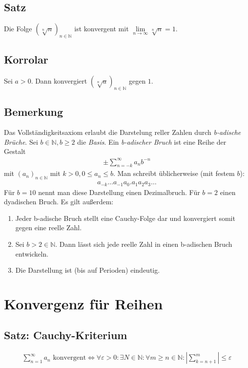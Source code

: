 \documentclass{scrreprt}
\newcommand{\NN}{\mathbb{N}}
\begin{document}
   	\section{Satz}
   	Die Folge $(\sqrt[n]{n})_{n \in \NN}$ ist konvergent mit $\lim\limits_{n \to \infty} \sqrt[n]{n} = 1$.

   	\section{Korrolar}
   	Sei $a>0$. Dann konvergiert $(\sqrt[n]{a})_{n \in \NN}$ gegen $1$.

   	\section{Bemerkung}
   	Das Vollständigkeitsaxiom erlaubt die Darstelung reller Zahlen durch \emph{b-adische Brüche}. Sei $b \in \NN, b \geq 2$ die \emph{Basis}. Ein \emph{b-adischer Bruch} ist eine Reihe der Gestalt
   	\begin{align*}
   		\pm\sum\limits_{n = -k}^\infty a_n b^{-n}
   	\end{align*}
   	mit $(a_n)_{n \in \NN}$ mit $k>0, 0 \leq a_n \leq b$. Man schreibt üblicherweise (mit festem $b$):
   	\begin{align*}
   		a_{-k}\dots a_{-1} a_0 . a_1 a_2 a_3 \dots
   	\end{align*}
   	Für $b = 10$ nennt man diese Darstellung einen Dezimalbruch. Für $b=2$ einen dyadischen Bruch. Es gilt außerdem:
   	\begin{enumerate}
   		\item
   		Jeder b-adische Bruch stellt eine Cauchy-Folge dar und konvergiert somit gegen eine reelle Zahl.
   		\item
   		Sei $b > 2 \in \NN$. Dann lässt sich jede reelle Zahl in einen b-adischen Bruch entwickeln.
   		\item
   		Die Darstellung ist (bis auf Perioden) eindeutig.
   	\end{enumerate}

   	\chapter{Konvergenz für Reihen}

   	\section{Satz: Cauchy-Kriterium}
   	\begin{align*}
   		\sum\limits_{n = 1}^\infty a_n \text{ konvergent} \Leftrightarrow \forall \varepsilon > 0 :\exists N \in \NN: \forall m \geq n \in \NN : \left| \sum\limits_{k = n+1}^m\right| \leq \varepsilon
   	\end{align*}
\end{document}
